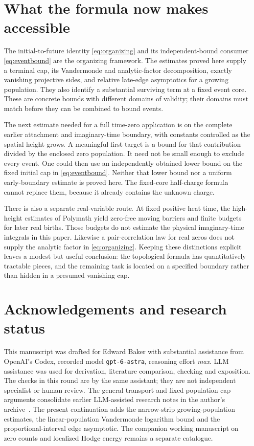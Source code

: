 \section{What the formula now makes accessible}
\label{sec:outlook}

The initial-to-future identity \eqref{eq:organizing} and its
independent-bound consumer \eqref{eq:eventbound} are the organizing
framework. The estimates proved here supply a terminal cap, its
Vandermonde and analytic-factor decomposition, exactly vanishing
projective sides, and relative late-edge asymptotics for a growing
population. They also identify a substantial surviving term at a
fixed event core. These are concrete bounds with different domains
of validity; their domains must match before they can be combined
to bound events.

The next estimate needed for a full time-zero application is on the
complete earlier attachment and imaginary-time boundary, with
constants controlled as the spatial height grows. A meaningful
first target is a bound for that contribution divided by the
enclosed zero population. It need not be small enough to exclude
every event. One could then use an independently obtained lower
bound on the fixed initial cap in \eqref{eq:eventbound}. Neither
that lower bound nor a uniform early-boundary estimate is proved
here. The fixed-core half-charge formula cannot replace them,
because it already contains the unknown charge.

There is also a separate real-variable route. At fixed positive
heat time, the high-height estimates of Polymath yield zero-free
moving barriers and finite budgets for later real births. Those
budgets do not estimate the physical imaginary-time integrals in
this paper. Likewise a pair-correlation law for real zeros does
not supply the analytic factor in \eqref{eq:organizing}. Keeping
these distinctions explicit leaves a modest but useful conclusion:
the topological formula has quantitatively tractable pieces, and
the remaining task is located on a specified boundary rather than
hidden in a presumed vanishing cap.

\section*{Acknowledgements and research status}
This manuscript was drafted for Edward Baker with substantial
assistance from OpenAI's Codex, recorded model \texttt{gpt-6-astra},
reasoning effort \emph{max}. LLM assistance was used for derivation,
literature comparison, checking and exposition. The checks in this
round are by the same assistant; they are not independent specialist
or human review. The general transport and fixed-population cap
arguments consolidate earlier LLM-assisted research notes in the
author's archive~\cite{Archive}. The present continuation adds the
narrow-strip growing-population estimates, the linear-population
Vandermonde logarithm bound and the proportional-interval edge
asymptotic. The companion working manuscript on zero counts and
localized Hodge energy remains a separate catalogue.

